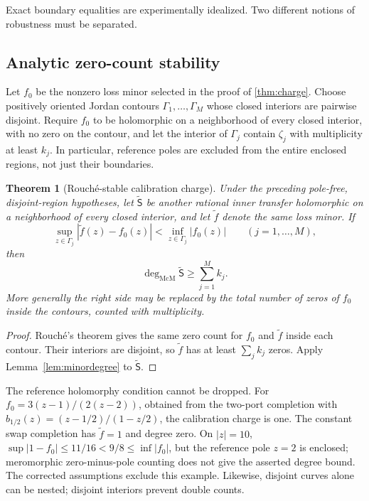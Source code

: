 \documentclass[11pt]{article}
\newtheorem{theorem}{Theorem}[section]
\theoremstyle{definition}
\theoremstyle{remark}
\newcommand{\mcdeg}{\deg_{\mathrm{McM}}}
\begin{document}
Exact boundary equalities are experimentally idealized.  Two different
notions of robustness must be separated.

\subsection{Analytic zero-count stability}

Let $f_0$ be the nonzero loss minor selected in the proof of
\cref{thm:charge}. Choose positively oriented Jordan contours
$\Gamma_1,\ldots,\Gamma_M$ whose closed interiors are pairwise disjoint.
Require $f_0$ to be holomorphic on a neighborhood of every closed interior,
with no zero on the contour, and let the interior of $\Gamma_j$ contain
$\zeta_j$ with multiplicity at least $k_j$. In particular, reference poles
are excluded from the entire enclosed regions, not just their boundaries.

\begin{theorem}[Rouch\'e-stable calibration charge]
\label{thm:rouche}
Under the preceding pole-free, disjoint-region hypotheses, let
$\widetilde{\mathsf S}$ be another rational inner transfer holomorphic on
a neighborhood of every closed interior, and let $\widetilde f$ denote
the same loss minor. If
\begin{equation}\label{eq:rouche}
 \sup_{z\in\Gamma_j}|\widetilde f(z)-f_0(z)|
 <\inf_{z\in\Gamma_j}|f_0(z)|
 \qquad(j=1,\ldots,M),
\end{equation}
then
\begin{equation}\label{eq:robustdegree}
 \mcdeg\widetilde{\mathsf S}\geq\sum_{j=1}^{M}k_j.
\end{equation}
More generally the right side may be replaced by the total number of zeros
of $f_0$ inside the contours, counted with multiplicity.
\end{theorem}

\begin{proof}
Rouch\'e's theorem \cite{Ahlfors1979} gives the same zero count for $f_0$ and
$\widetilde f$ inside each contour.  Their interiors are disjoint, so
$\widetilde f$ has at least $\sum_jk_j$ zeros.  Apply
Lemma~\ref{lem:minordegree} to $\widetilde{\mathsf S}$.
\end{proof}

The reference holomorphy condition cannot be dropped. For
$f_0=3(z-1)/(2(z-2))$, obtained from the two-port completion with
$b_{1/2}(z)=(z-1/2)/(1-z/2)$, the calibration charge is one. The constant
swap completion has $\widetilde f=1$ and degree zero. On $|z|=10$,
$\sup|1-f_0|\leq11/16<9/8\leq\inf|f_0|$, but the reference pole $z=2$
is enclosed; meromorphic zero-minus-pole counting does not give the asserted
degree bound. The corrected assumptions exclude this example. Likewise,
disjoint curves alone can be nested; disjoint interiors prevent double counts.
\end{document}
